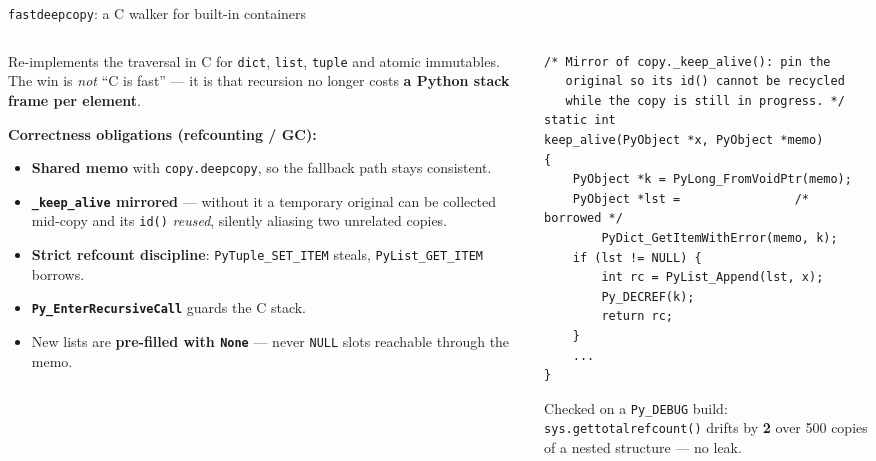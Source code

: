 \documentclass[aspectratio=169,11pt]{beamer}
\begin{document}
\begin{frame}[fragile]{\texttt{fastdeepcopy}: a C walker for built-in containers}
\begin{columns}[T]
\begin{column}{0.5\textwidth}
\footnotesize
Re-implements the traversal in C for \texttt{dict}, \texttt{list},
\texttt{tuple} and atomic immutables. The win is \emph{not} ``C is fast'' ---
it is that recursion no longer costs \textbf{a Python stack frame per
element}.

\vspace{5pt}
\textbf{Correctness obligations (refcounting / GC):}
\begin{itemize}\scriptsize
  \item \textbf{Shared memo} with \texttt{copy.deepcopy}, so the fallback path
        stays consistent.
  \item \textbf{\texttt{\_keep\_alive} mirrored} --- without it a temporary
        original can be collected mid-copy and its \texttt{id()} \emph{reused},
        silently aliasing two unrelated copies.
  \item \textbf{Strict refcount discipline}:
        \texttt{PyTuple\_SET\_ITEM} steals, \texttt{PyList\_GET\_ITEM} borrows.
  \item \textbf{\texttt{Py\_EnterRecursiveCall}} guards the C stack.
  \item New lists are \textbf{pre-filled with \texttt{None}} --- never
        \texttt{NULL} slots reachable through the memo.
\end{itemize}
\end{column}
\begin{column}{0.48\textwidth}
\begin{lstlisting}[style=c]
/* Mirror of copy._keep_alive(): pin the
   original so its id() cannot be recycled
   while the copy is still in progress. */
static int
keep_alive(PyObject *x, PyObject *memo)
{
    PyObject *k = PyLong_FromVoidPtr(memo);
    PyObject *lst =                /* borrowed */
        PyDict_GetItemWithError(memo, k);
    if (lst != NULL) {
        int rc = PyList_Append(lst, x);
        Py_DECREF(k);
        return rc;
    }
    ...
}
\end{lstlisting}
\vspace{1pt}
\scriptsize
Checked on a \texttt{Py\_DEBUG} build:
\texttt{sys.gettotalrefcount()} drifts by \textbf{2} over 500 copies of a
nested structure --- no leak.
\end{column}
\end{columns}
\end{frame}
\end{document}

